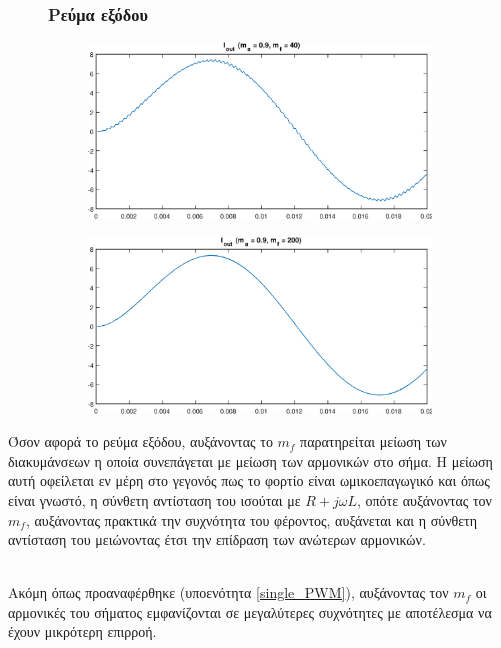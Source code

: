 \begin{figure}[h!]
	\subsubsection*{Ρεύμα εξόδου}
	\begin{subfigure}{0.49\textwidth}
		\centering
		\includegraphics[width=1\textwidth]{Images/I_out_40}
	\end{subfigure}
	\begin{subfigure}{0.49\textwidth}
		\centering
		\includegraphics[width=1\textwidth]{Images/I_out_200}
	\end{subfigure}
\end{figure}
\noindent
Όσον αφορά το ρεύμα εξόδου, αυξάνοντας το $m_f$ παρατηρείται μείωση των διακυμάνσεων η οποία συνεπάγεται με μείωση των αρμονικών στο σήμα.
Η μείωση αυτή οφείλεται εν μέρη στο γεγονός πως το φορτίο είναι ωμικοεπαγωγικό και όπως είναι γνωστό, η σύνθετη αντίσταση του ισούται με $R + j\omega L$, οπότε αυξάνοντας τον $m_f$, αυξάνοντας πρακτικά την συχνότητα του φέροντος, αυξάνεται και η σύνθετη αντίσταση του μειώνοντας  έτσι την επίδραση των ανώτερων αρμονικών.

\noindent\\
 Ακόμη όπως προαναφέρθηκε (υποενότητα \ref{single_PWM}), αυξάνοντας τον $m_f$ οι αρμονικές του σήματος εμφανίζονται σε μεγαλύτερες συχνότητες με αποτέλεσμα να έχουν μικρότερη επιρροή.\\

